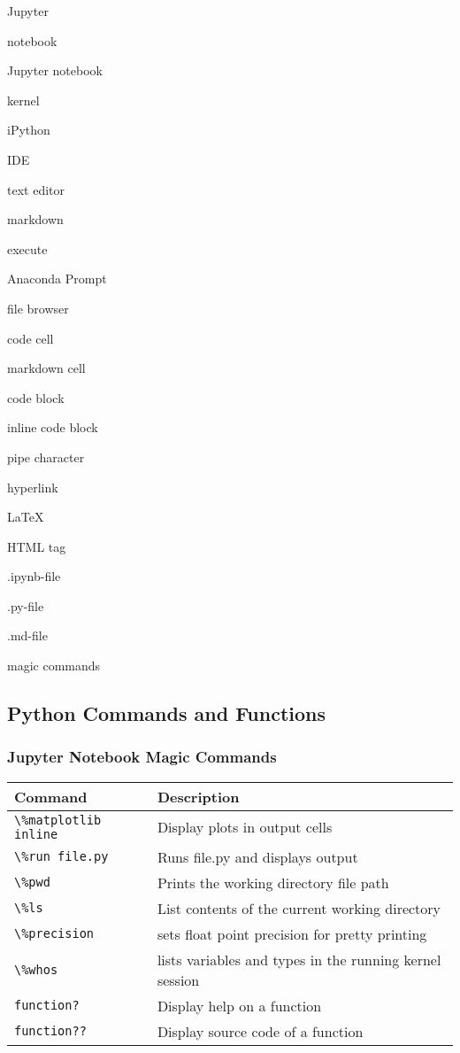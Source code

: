 \documentclass{book}
\newenvironment{key_terms}{\begin{multicols}{3}}{\end{multicols}} %
\newcommand{\passthrough}[1]{#1}
\begin{document}
    
        \begin{key_terms}
        Jupyter

notebook

Jupyter notebook

kernel

iPython

IDE

text editor

markdown

execute

Anaconda Prompt

file browser

code cell

markdown cell

code block

inline code block

pipe character

hyperlink

LaTeX

HTML tag

.ipynb-file

.py-file

.md-file

magic commands
        \end{key_terms}

    




    
        \hypertarget{python-commands-and-functions}{%
\subsection{Python Commands and
Functions}\label{python-commands-and-functions}}
    




    
        \hypertarget{jupyter-notebook-magic-commands}{%
\subsubsection{Jupyter Notebook Magic
Commands}\label{jupyter-notebook-magic-commands}}

\begin{longtable}[]{@{}ll@{}}
\toprule
Command & Description\tabularnewline
\midrule
\endhead
\passthrough{\lstinline!\%matplotlib inline!} & Display plots in output
cells\tabularnewline
\passthrough{\lstinline!\%run file.py!} & Runs file.py and displays
output\tabularnewline
\passthrough{\lstinline!\%pwd!} & Prints the working directory file
path\tabularnewline
\passthrough{\lstinline!\%ls!} & List contents of the current working
directory\tabularnewline
\passthrough{\lstinline!\%precision!} & sets float point precision for
pretty printing\tabularnewline
\passthrough{\lstinline!\%whos!} & lists variables and types in the
running kernel session\tabularnewline
\passthrough{\lstinline!function?!} & Display help on a
function\tabularnewline
\passthrough{\lstinline!function??!} & Display source code of a
function\tabularnewline
\bottomrule
\end{longtable}
    
\end{document}
